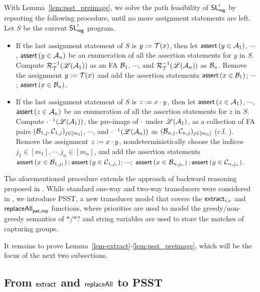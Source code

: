 With Lemma~\ref{lem:psst_preimage}, we  solve the path feasibility of $\mathsf{SL}'_{\sf reg}$ by repeating the following procedure, until no more assignment statements are left. Let $S$ be the current $\mathsf{SL}'_{\sf reg}$ program.
\begin{itemize}
\item If the last assignment statement of $S$ is $y:=\mathcal{T}(x)$, then let $\textsf{assert}\left(y \in \mathcal{A}_1\right)$, $\cdots$, $\textsf{assert}\left(y \in \mathcal{A}_n\right)$ be an enumeration of all the assertion statements for $y$ in $S$. Compute $\mathcal{R}^{-1}_{\mathcal{T}}(\mathscr{L}(\mathcal{A}_1))$ as an FA $\mathcal{B}_1$, $\cdots$, and $\mathcal{R}^{-1}_{\mathcal{T}}(\mathscr{L}(\mathcal{A}_n))$ as $\mathcal{B}_n$. Remove  the assignment  $y:=\mathcal{T}(x)$ and add the assertion statements $\textsf{assert}\left(x \in \mathcal{B}_1\right)$; $\cdots$; $\textsf{assert}\left(x \in \mathcal{B}_n\right)$. 
%
\item If the last assignment statement of $S$ is $z:=x \cdot y$, then let $\textsf{assert}\left(z \in \mathcal{A}_1\right)$, $\cdots$, $\textsf{assert}\left(z \in \mathcal{A}_n\right)$ be an enumeration of all the assertion statements for $z$ in $S$. Compute $\cdot^{-1}(\mathscr{L}(\mathcal{A}_1))$, the pre-image of $\cdot$ under $\mathscr{L}(\mathcal{A}_1)$, as a collection of FA pairs $(\mathcal{B}_{1,j}, \mathcal{C}_{1,j})_{j \in [m_1]}$, $\cdots$, and $\cdot^{-1}(\mathscr{L}(\mathcal{A}_n))$ as $(\mathcal{B}_{n, j}, \mathcal{C}_{n,j})_{j \in [m_n]}$ (c.f. \cite{CHL+19}). Remove the assignment $z:=x \cdot y$, nondeterministically choose the indices $j_1 \in [m_1], \cdots, j_n \in [m_n]$, and add the assertion statements $\textsf{assert}\left(x \in \mathcal{B}_{1,j_1}\right); \textsf{assert}\left(y \in \mathcal{C}_{1, j_1}\right)$; $\cdots$; $\textsf{assert}\left(x \in \mathcal{B}_{n,j_n}\right); \textsf{assert}\left(y \in \mathcal{C}_{n, j_n}\right)$. 
\end{itemize}

\begin{remark}
The aforementioned procedure extends the approach of backward reasoning proposed in \cite{CCH+18,CHL+19}. While standard one-way and two-way transducers were considered in \cite{CCH+18,CHL+19}, we introduce PSST, a new transducer model that covers the $\mathsf{extract}_{i,e}$ and $\mathsf{replaceAll}_{\sf pat, rep}$ functions, where priorities are used to model the greedy/non-greedy semantics of $*$/$*?$ and string variables are used to store the matches of capturing groups. 
\end{remark}

It remains to prove Lemma~\ref{lem-extract}-\ref{lem:psst_preimage}, which will be the focus of the next two subsections.



\subsection{From $\mathsf{extract}$ and $\mathsf{replaceAll}$ to PSST}\label{sec-extract-replace-to-psst}

